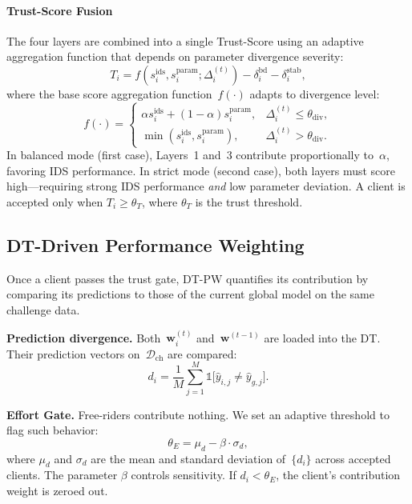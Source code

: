 \documentclass[conference]{IEEEtran}
\begin{document}
\paragraph{Trust-Score Fusion} The four layers are combined into a single Trust-Score using an adaptive aggregation function that depends on parameter divergence severity:
\begin{equation}
    T_i = f(s_i^{\text{ids}}, s_i^{\text{param}}; \Delta_i^{(t)}) - \delta_i^{\text{bd}} - \delta_i^{\text{stab}},
\label{eq:trust}
\end{equation}
where the base score aggregation function~$f(\cdot)$ adapts to divergence level:
\begin{equation}
    f(\cdot) =
    \begin{cases}
        \alpha s_i^{\text{ids}} + (1{-}\alpha) s_i^{\text{param}}, & \Delta_i^{(t)} \le \theta_{\text{div}}, \\[4pt]
        \min(s_i^{\text{ids}}, s_i^{\text{param}}), & \Delta_i^{(t)} > \theta_{\text{div}}.
    \end{cases}
\label{eq:trust-aggregation}
\end{equation}
In balanced mode (first case), Layers~1 and~3 contribute proportionally to~$\alpha$, favoring IDS performance. In strict mode (second case), both layers must score high—requiring strong IDS performance \emph{and} low parameter deviation. A client is accepted only when $T_i \ge \theta_T$, where $\theta_T$ is the trust threshold.



\subsection{DT-Driven Performance Weighting}\label{sec:dtpw}

Once a client passes the trust gate, DT-PW quantifies its contribution by comparing its predictions to those of the current global model on the same challenge data.

\textbf{Prediction divergence.} Both~$\mathbf{w}_i^{(t)}$ and~$\mathbf{w}^{(t-1)}$ are loaded into the DT. Their prediction vectors on~$\mathcal{D}_{\text{ch}}$ are compared:
\begin{equation}
    d_i = \frac{1}{M}\sum_{j=1}^{M} \mathbb{1}\!\bigl[\hat{y}_{i,j} \neq \hat{y}_{g,j}\bigr].
\label{eq:divergence}
\end{equation}

\textbf{Effort Gate.} Free-riders contribute nothing. We set an adaptive threshold to flag such behavior:
\begin{equation}
    \theta_E = \mu_d - \beta \cdot \sigma_d,
\label{eq:effort}
\end{equation}
where $\mu_d$ and $\sigma_d$ are the mean and standard deviation of~$\{d_i\}$ across accepted clients. The parameter $\beta$ controls sensitivity. If $d_i < \theta_E$, the client's contribution weight is zeroed out.
\end{document}
